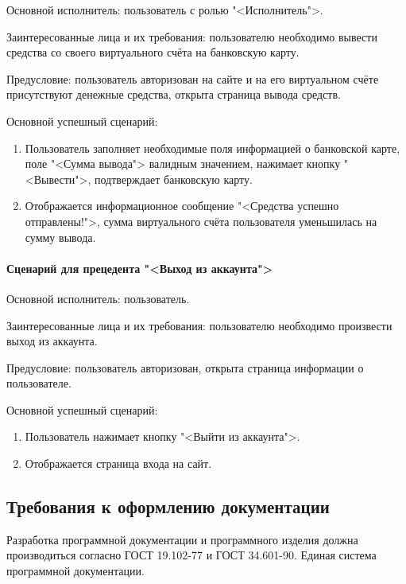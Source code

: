 Основной исполнитель: пользователь с ролью "<Исполнитель">.

Заинтересованные лица и их требования: пользователю необходимо вывести средства со своего виртуального счёта на банковскую карту.

Предусловие: пользователь авторизован на сайте и на его виртуальном счёте присутствуют денежные средства, открыта страница вывода средств.

Основной успешный сценарий: 
	
\begin{enumerate}
	\item Пользователь заполняет необходимые поля информацией о банковской карте, поле "<Сумма вывода"> валидным значением, нажимает кнопку "<Вывести">, подтверждает банковскую карту. 
	\item Отображается информационное сообщение "<Средства успешно отправлены!">, сумма виртуального счёта пользователя уменьшилась на сумму вывода.
\end{enumerate}

\paragraph{Сценарий для прецедента "<Выход из аккаунта">}

Основной исполнитель: пользователь.

Заинтересованные лица и их требования: пользователю необходимо произвести выход из аккаунта.

Предусловие: пользователь авторизован, открыта страница информации о пользователе.

Основной успешный сценарий:
	
\begin{enumerate}
	\item Пользователь нажимает кнопку "<Выйти из аккаунта">. 
	\item Отображается страница входа на сайт.
\end{enumerate}

\subsection{Требования к оформлению документации}

Разработка программной документации и программного изделия должна производиться согласно ГОСТ 19.102-77 и ГОСТ 34.601-90. Единая система программной документации.
